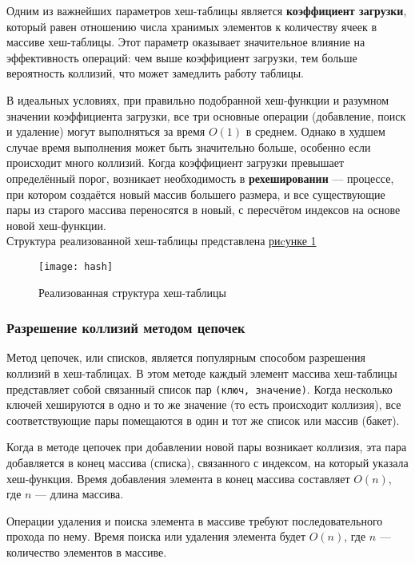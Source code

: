 \documentclass[10pt,a4paper,final]{article} %
\begin{document}
Одним из важнейших параметров хеш-таблицы является \textbf{коэффициент загрузки}, который равен отношению числа хранимых элементов к количеству ячеек в массиве хеш-таблицы. Этот параметр оказывает значительное влияние на эффективность операций: чем выше коэффициент загрузки, тем больше вероятность коллизий, что может замедлить работу таблицы.

В идеальных условиях, при правильно подобранной хеш-функции и разумном значении коэффициента загрузки, все три основные операции (добавление, поиск и удаление) могут выполняться за время $O(1)$ в среднем. Однако в худшем случае время выполнения может быть значительно больше, особенно если происходит много коллизий. Когда коэффициент загрузки превышает определённый порог, возникает необходимость в \textbf{рехешировании} — процессе, при котором создаётся новый массив большего размера, и все существующие пары из старого массива переносятся в новый, с пересчётом индексов на основе новой хеш-функции.\\
Структура реализованной хеш-таблицы представлена \hyperref[fig:hash]{риcунке 1}

\begin{figure}[htbp]
	\centering
	\texttt{[image: hash]}
	\caption{Реализованная структура хеш-таблицы}
	\label{fig:hash}
\end{figure}



\subsubsection{Разрешение коллизий методом цепочек}

Метод цепочек, или списков, является популярным способом разрешения коллизий в хеш-таблицах. В этом методе каждый элемент массива хеш-таблицы представляет собой связанный список пар \texttt{(ключ, значение)}. Когда несколько ключей хешируются в одно и то же значение (то есть происходит коллизия), все соответствующие пары помещаются в один и тот же список или массив (бакет). 

Когда в методе цепочек при добавлении новой пары возникает коллизия, эта пара добавляется в конец массива (списка), связанного с индексом, на который указала хеш-функция. Время добавления элемента в конец массива составляет $O(n)$, где $n$ — длина массива.

Операции удаления и поиска элемента в массиве  требуют последовательного прохода по нему. Время поиска или удаления элемента будет $O(n)$, где $n$ — количество элементов в массиве. 
\end{document}
